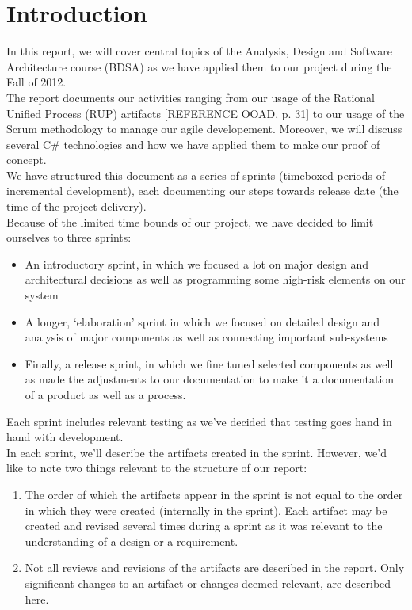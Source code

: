 \section{Introduction}
In this report, we will cover central topics of the Analysis, Design and Software Architecture course (BDSA) as we have applied them to our project during the Fall of 2012.\\
\newline
The report documents our activities ranging from our usage of the Rational Unified Process (RUP) artifacts [REFERENCE OOAD, p. 31] to our usage of the Scrum methodology to manage our agile developement. Moreover, we will discuss several C\# technologies and how we have applied them to make our proof of concept.\\
\newline
We have structured this document as a series of sprints (timeboxed periods of incremental development), each documenting our steps towards release date (the time of the project delivery).\\
\newline
Because of the limited time bounds of our project, we have decided to limit ourselves to three sprints:\\
\begin{itemize}
\item An introductory sprint, in which we focused a lot on major design and architectural decisions as well as programming some high-risk elements on our system
\item A longer, ‘elaboration’ sprint in which we focused on detailed design and analysis of major components as well as connecting important sub-systems 
\item Finally, a release sprint, in which we fine tuned selected components as well as made the adjustments to our documentation to make it a documentation of a product as well as a process.
\end{itemize}
Each sprint includes relevant testing as we’ve decided that testing goes hand in hand with development.\\
\newline
In each sprint, we’ll describe the artifacts created in the sprint. However,
we’d like to note two things relevant to the structure of our report:\\
\begin{enumerate}
\item The order of which the artifacts appear in the sprint is not equal to the
  order in which they were created (internally in the sprint). Each artifact
  may be created and revised several times during a sprint as it was relevant
  to the understanding of a design or a requirement. 
\item Not all reviews and revisions of the artifacts are described in the
  report. Only significant changes to an artifact or changes deemed relevant,
  are described here.
\end{enumerate}
\newpage
